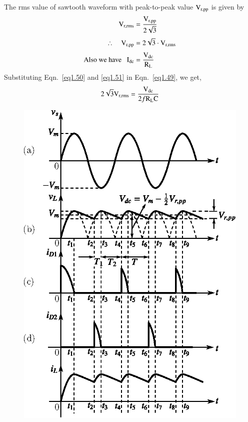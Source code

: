 The rms value of sawtooth waveform with peak-to-peak value $\textrm{V}_{\text{r,pp}}$ is given by
\begin{align}
\textrm{V}_{\text{r,rms}} &= \frac{\textrm{V}_{\text{r,pp}}}{2\sqrt{3}}\notag\\[3pt]
\therefore\quad \textrm{V}_{\text{r,pp}} &= 2\sqrt{3}\cdot \textrm{V}_{\text{r,rms}}\label{eq1.50}\\[3pt]
\text{Also we have~~ } \textrm{I}_{\text{dc}} &= \frac{\textrm{V}_{\text{dc}}}{\textrm{R}_{\textrm{L}}}\label{eq1.51}
\end{align}
Substituting Eqn.~\eqref{eq1.50} and \eqref{eq1.51} in Eqn.~\eqref{eq1.49}, we get,
$$
2\sqrt{3}\textrm{V}_{\text{r,rms}} = \frac{\textrm{V}_{\text{dc}}}{2f\textrm{R}_{\textrm{L}}\textrm{C}}
$$
\begin{figure}[H]
\centering
\includegraphics{chap1/fig1.41.eps}
\caption{}\label{fig1.41}
\end{figure}

